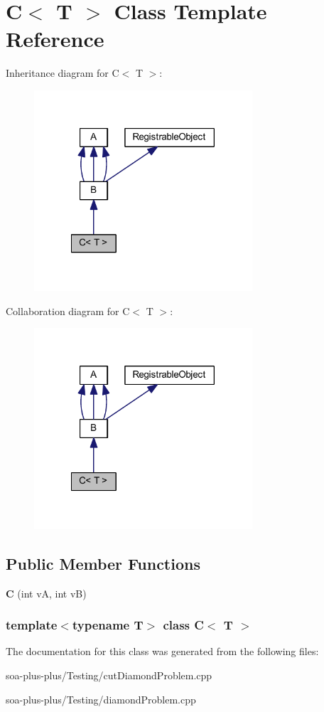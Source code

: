 \hypertarget{class_c}{
\section{C$<$ T $>$ Class Template Reference}
\label{class_c}
}


Inheritance diagram for C$<$ T $>$:\nopagebreak
\begin{figure}[H]
\begin{center}
\leavevmode
\includegraphics[width=230pt]{class_c__inherit__graph}
\end{center}
\end{figure}


Collaboration diagram for C$<$ T $>$:\nopagebreak
\begin{figure}[H]
\begin{center}
\leavevmode
\includegraphics[width=230pt]{class_c__coll__graph}
\end{center}
\end{figure}
\subsection*{Public Member Functions}
\begin{DoxyCompactItemize}
\item 
\hypertarget{class_c_a147c0dd2ff2c98ee691f5380b613b1cf}{
{\bfseries C} (int vA, int vB)}
\label{class_c_a147c0dd2ff2c98ee691f5380b613b1cf}

\end{DoxyCompactItemize}
\subsubsection*{template$<$typename T$>$ class C$<$ T $>$}



The documentation for this class was generated from the following files:\begin{DoxyCompactItemize}
\item 
soa-\/plus-\/plus/Testing/cutDiamondProblem.cpp\item 
soa-\/plus-\/plus/Testing/diamondProblem.cpp\end{DoxyCompactItemize}
